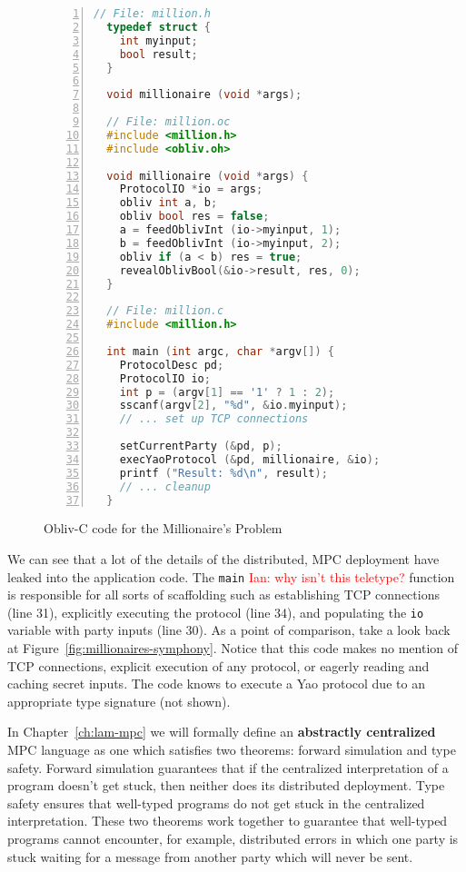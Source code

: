 \documentclass{report}
\newcommand{\ins}[1]{\textcolor{red}{Ian: #1}}
\begin{document}
\begin{figure}[h]
\begin{lstlisting}[language=c,basicstyle=\footnotesize,numbers=left,stepnumber=1]
  // File: million.h
  typedef struct {
    int myinput;
    bool result;
  }

  void millionaire (void *args);

  // File: million.oc
  #include <million.h>
  #include <obliv.oh>

  void millionaire (void *args) {
    ProtocolIO *io = args;
    obliv int a, b;
    obliv bool res = false;
    a = feedOblivInt (io->myinput, 1);
    b = feedOblivInt (io->myinput, 2);
    obliv if (a < b) res = true;
    revealOblivBool(&io->result, res, 0);
  }

  // File: million.c
  #include <million.h>

  int main (int argc, char *argv[]) {
    ProtocolDesc pd;
    ProtocolIO io;
    int p = (argv[1] == '1' ? 1 : 2);
    sscanf(argv[2], "%d", &io.myinput);
    // ... set up TCP connections

    setCurrentParty (&pd, p);
    execYaoProtocol (&pd, millionaire, &io);
    printf ("Result: %d\n", result);
    // ... cleanup
  }
\end{lstlisting}
\caption{Obliv-C code for the Millionaire's Problem}
\label{fig:millionaires-oblivc}
\end{figure}

We can see that a lot of the details of the distributed, MPC deployment have leaked into the application code. The
\lstinline[language=c]{main} \ins{why isn't this teletype?} function is responsible for all sorts of scaffolding such as establishing TCP connections (line 31),
explicitly executing the protocol (line 34), and populating the \lstinline[language=c]{io} variable with party inputs (line 30). As
a point of comparison, take a look back at Figure~\ref{fig:millionaires-symphony}. Notice that this code makes no mention of TCP connections,
explicit execution of any protocol, or eagerly reading and caching secret inputs. The code knows to execute a Yao protocol due to
an appropriate type signature (not shown).

In Chapter~\ref{ch:lam-mpc} we will formally define an \textbf{abstractly centralized} MPC language as one which satisfies two theorems:
forward simulation and type safety. Forward simulation guarantees that if the centralized interpretation of a program doesn't get stuck,
then neither does its distributed deployment. Type safety ensures that well-typed programs do not get stuck in the centralized interpretation.
These two theorems work together to guarantee that well-typed programs cannot encounter, for example, distributed errors in
which one party is stuck waiting for a message from another party which will never be sent.
\end{document}
